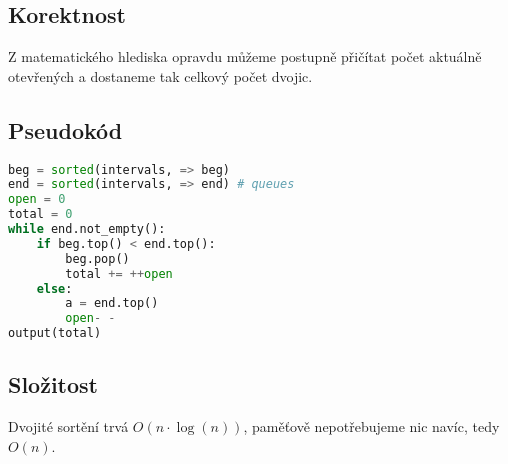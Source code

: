 \documentclass[a4paper]{article}
\begin{document}
\subsection{Korektnost}
Z matematického hlediska opravdu můžeme postupně přičítat počet aktuálně otevřených a dostaneme tak celkový počet dvojic.

\subsection{Pseudokód}
\begin{lstlisting}[language=Python]
beg = sorted(intervals, => beg)
end = sorted(intervals, => end) # queues
open = 0
total = 0
while end.not_empty():
	if beg.top() < end.top():
		beg.pop()
		total += ++open
	else:
		a = end.top()
		open- -
output(total)

\end{lstlisting}

\subsection{Složitost}
Dvojité sortění trvá $O(n \cdot \log(n))$, paměťově nepotřebujeme nic navíc, tedy $O(n)$.
\end{document}
